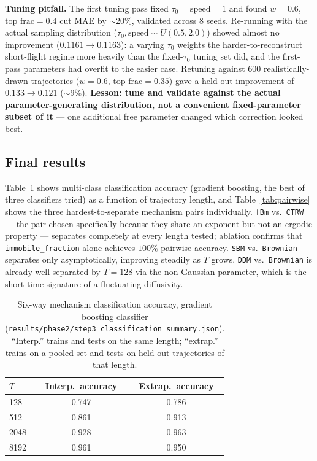 \documentclass[11pt]{article}
\newcommand{\code}[1]{\texttt{#1}}
\begin{document}
\textbf{Tuning pitfall.} The first tuning pass fixed $\tau_0{=}\mathrm{speed}{=}1$
and found $w{=}0.6$, $\mathrm{top\_frac}{=}0.4$ cut MAE by $\sim20\%$,
validated across 8 seeds. Re-running with the actual sampling distribution
($\tau_0,\mathrm{speed}\sim U(0.5,2.0)$) showed almost no improvement
($0.1161\to0.1163$): a varying $\tau_0$ weights the harder-to-reconstruct
short-flight regime more heavily than the fixed-$\tau_0$ tuning set did, and
the first-pass parameters had overfit to the easier case. Retuning against
600 realistically-drawn trajectories ($w{=}0.6$,
$\mathrm{top\_frac}{=}0.35$) gave a held-out improvement of $0.133\to0.121$
($\sim9\%$). \textbf{Lesson: tune and validate against the actual
parameter-generating distribution, not a convenient fixed-parameter subset of
it} --- one additional free parameter changed which correction looked best.

\subsection{Final results}

Table~\ref{tab:classification} shows multi-class classification accuracy
(gradient boosting, the best of three classifiers tried) as a function of
trajectory length, and Table~\ref{tab:pairwise} shows the three
hardest-to-separate mechanism pairs individually. \code{fBm} vs.\ \code{CTRW}
--- the pair chosen specifically because they share an exponent but not an
ergodic property --- separates completely at every length tested; ablation
confirms that \code{immobile\_fraction} alone achieves $100\%$ pairwise
accuracy. \code{SBM} vs.\ \code{Brownian} separates only asymptotically,
improving steadily as $T$ grows. \code{DDM} vs.\ \code{Brownian} is already
well separated by $T{=}128$ via the non-Gaussian parameter, which is the
short-time signature of a fluctuating diffusivity.

\begin{table}[htbp]
\centering
\caption{Six-way mechanism classification accuracy, gradient boosting
classifier (\code{results/phase2/step3\_classification\_summary.json}).
``Interp.'' trains and tests on the same length; ``extrap.'' trains on a
pooled set and tests on held-out trajectories of that length.}
\label{tab:classification}
\begin{tabular}{lcc}
\toprule
$T$ & Interp.\ accuracy & Extrap.\ accuracy \\
\midrule
128 & 0.747 & 0.786 \\
512 & 0.861 & 0.913 \\
2048 & 0.928 & 0.963 \\
8192 & 0.961 & 0.950 \\
\bottomrule
\end{tabular}
\end{table}
\end{document}
